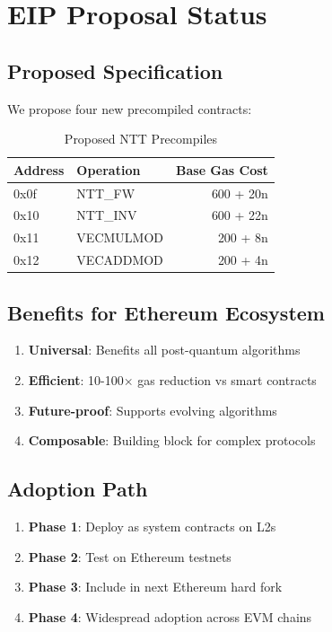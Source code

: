 \section{EIP Proposal Status}


\subsection{Proposed Specification}

We propose four new precompiled contracts:

\begin{table}[h]
\centering
\caption{Proposed NTT Precompiles}
\begin{tabular}{llr}
\toprule
Address & Operation & Base Gas Cost \\
\midrule
0x0f & NTT\_FW & 600 + 20n \\
0x10 & NTT\_INV & 600 + 22n \\
0x11 & VECMULMOD & 200 + 8n \\
0x12 & VECADDMOD & 200 + 4n \\
\bottomrule
\end{tabular}
\end{table}

\subsection{Benefits for Ethereum Ecosystem}

\begin{enumerate}
\item \textbf{Universal}: Benefits all post-quantum algorithms
\item \textbf{Efficient}: 10-100$\times$ gas reduction vs smart contracts
\item \textbf{Future-proof}: Supports evolving algorithms
\item \textbf{Composable}: Building block for complex protocols
\end{enumerate}

\subsection{Adoption Path}

\begin{enumerate}
\item \textbf{Phase 1}: Deploy as system contracts on L2s
\item \textbf{Phase 2}: Test on Ethereum testnets
\item \textbf{Phase 3}: Include in next Ethereum hard fork
\item \textbf{Phase 4}: Widespread adoption across EVM chains
\end{enumerate}

